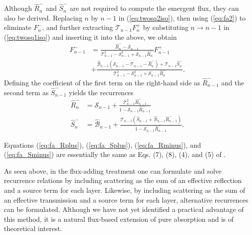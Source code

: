 Although $\hat{R}^-_n$ and $\hat{S}^-_n$ are not required to compute the emergent flux, they can also be derived. Replacing $n$ by $n-1$ in (\ref{eq:twosq2iso}), then using (\ref{eq:fa2}) to eliminate $F_n^-$, and further extracting $\mathcal{T}_{n-1} F_n^+$ by substituting $n \to n-1$ in (\ref{eq:twosq1iso}) and inserting it into the above, we obtain
\begin{align}
    \label{eq:recursive_fa2}
    F_{n-1}^- &= \frac{\hat{R}_n^- - \mathcal{S}_{n-1}}{  \mathcal{T}_{n-1}^2 -\mathcal{S}_{n-1}^2 +  \mathcal{S}_{n-1} \hat{R}_n^-} F_{n-1}^+ \nonumber \\
    &+ \frac{\hat{\mathcal{B}}_{n-1}(\mathcal{S}_{n-1} - \mathcal{T}_{n-1}- \hat{R}_n^- ) + \mathcal{T}_{n-1} \hat{S}_n^-}{  \mathcal{T}_{n-1}^2 -\mathcal{S}_{n-1}^2 +  \mathcal{S}_{n-1} \hat{R}_n^-}.
\end{align}
Defining the coefficient of the first term on the right-hand side as $\hat{R}_{n-1}^-$ and the second term as $\hat{S}_{n-1}^-$ yields the recurrences
\begin{align}
    \label{eq:fa_Rminus}
    \hat{R}_n^- &= \mathcal{S}_{n-1} + \frac{\mathcal{T}_{n-1}^2 \hat{R}_{n-1}^-}{1 - \mathcal{S}_{n-1} \hat{R}_{n-1}^-} \\
    \label{eq:fa_Sminus}
    \hat{S}_n^- &= \hat{\mathcal{B}}_{n-1} + \frac{\mathcal{T}_{n-1} (\hat{S}_{n-1} + \hat{\mathcal{B}}_{n-1} \hat{R}_{n-1}^-)}{1 - \mathcal{S}_{n-1} \hat{R}_{n-1}^-}.
\end{align}

Equations (\ref{eq:fa_Rplus}), (\ref{eq:fa_Splus}), (\ref{eq:fa_Rminus}), and (\ref{eq:fa_Sminus}) are essentially the same as Eqs. (7), (8), (4), and (5) of \cite{2018JQSRT.211...78R}.

As seen above, in the flux-adding treatment one can formulate and solve recurrence relations by including scattering as the sum of an effective reflection and a source term for each layer. Likewise, by including scattering as the sum of an effective transmission and a source term for each layer, alternative recurrences can be formulated. Although we have not yet identified a practical advantage of this method, it is a natural flux-based extension of pure absorption and is of theoretical interest.
